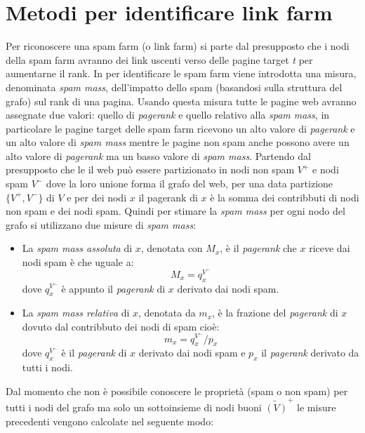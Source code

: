 \section{Metodi per identificare link farm}
Per riconoscere una spam farm (o link farm) si parte dal presupposto che i nodi della spam farm avranno dei link uscenti verso delle pagine target \textit{t} per aumentarne il rank. In \cite{Gyongyi:2006:LSD:1182635.1164166} per identificare le spam farm viene introdotta una misura, denominata \textit{spam mass}, dell'impatto dello spam (basandosi sulla struttura del grafo) sul rank di una pagina. Usando questa misura tutte le pagine web avranno assegnate due valori: quello di \textit{pagerank} e quello relativo alla \textit{spam mass}, in particolare le pagine target delle spam farm ricevono  un alto valore di \textit{pagerank} e un alto valore di \textit{spam mass} mentre le pagine non spam anche possono avere un alto valore di \textit{pagerank} ma un basso valore di \textit{spam mass}. Partendo dal presupposto che le il web può essere partizionato in nodi non spam \(V^+\) e nodi spam \(V^-\) dove la loro unione forma il grafo del web, per una data partizione \(\{V^+,V^-\}\) di \(V\) e per dei nodi \(x\) 
il pagerank di \(x\) è la somma dei contribbuti di nodi non spam e dei nodi spam. Quindi per stimare la \textit{spam mass} per ogni nodo del grafo si utilizzano due misure di \textit{spam mass}:
\begin{itemize}
 \item La \textit{spam mass assoluta} di \(x\), denotata con \(M_x\), è il \textit{pagerank} che \(x\) riceve dai nodi spam è che uguale a:
 \begin{equation}
   M_x=q_x^{V^-}
 \end{equation}
dove \(q_x^{V^-}\) è appunto il \textit{pagerank} di \(x\) derivato dai nodi spam.
 \item La \textit{spam mass relativa} di \(x\), denotata da \(m_x\), è la frazione del \textit{pagerank} di \(x\) dovuto dal contribbuto dei nodi di spam cioè: 
 \begin{equation}
   m_x=q_x^{V^-}/p_x
 \end{equation}
dove \(q_x^{V^-}\) è il \textit{pagerank} di \(x\) derivato dai nodi spam e \(p_x\) il \textit{pagerank} derivato da tutti i nodi.
\end{itemize}
Dal momento che non è possibile conoscere le proprietà (spam o non spam) per tutti i nodi del grafo ma solo un sottoinsieme di nodi buoni \(\tilde{(V)}^+\) le misure precedenti vengono calcolate nel seguente modo:
